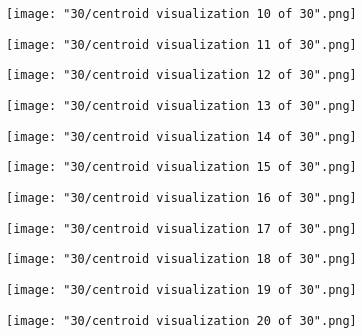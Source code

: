 \documentclass{article}
\begin{document}
\begin{figure}[h!]
    \noindent\texttt{[image: "30/centroid visualization 10 of 30".png]}
\end{figure}

\begin{figure}[h!]
    \noindent\texttt{[image: "30/centroid visualization 11 of 30".png]}
\end{figure}

\begin{figure}[h!]
    \noindent\texttt{[image: "30/centroid visualization 12 of 30".png]}
\end{figure}

\begin{figure}[h!]
    \noindent\texttt{[image: "30/centroid visualization 13 of 30".png]}
\end{figure}

\begin{figure}[h!]
    \noindent\texttt{[image: "30/centroid visualization 14 of 30".png]}
\end{figure}

\begin{figure}[h!]
    \noindent\texttt{[image: "30/centroid visualization 15 of 30".png]}
\end{figure}

\begin{figure}[h!]
    \noindent\texttt{[image: "30/centroid visualization 16 of 30".png]}
\end{figure}

\begin{figure}[h!]
    \noindent\texttt{[image: "30/centroid visualization 17 of 30".png]}
\end{figure}

\begin{figure}[h!]
    \noindent\texttt{[image: "30/centroid visualization 18 of 30".png]}
\end{figure}

\begin{figure}[h!]
    \noindent\texttt{[image: "30/centroid visualization 19 of 30".png]}
\end{figure}

\begin{figure}[h!]
    \noindent\texttt{[image: "30/centroid visualization 20 of 30".png]}
\end{figure}
\end{document}
